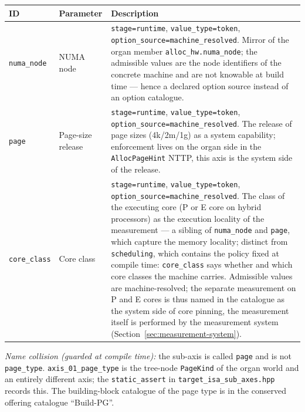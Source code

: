 \begin{scriptsize}
\begin{longtable}{@{}>{\raggedright\arraybackslash}p{1.8cm} >{\raggedright\arraybackslash}p{3.2cm} >{\raggedright\arraybackslash}p{8.5cm}@{}}
\toprule
ID & Parameter & Description \\
\midrule
\endhead%
\texttt{numa\_\allowbreak{}node} & NUMA node & \texttt{stage=runtime}, \texttt{value\_\allowbreak{}type=token}, \texttt{option\_\allowbreak{}source=machine\_\allowbreak{}resolved}. Mirror of the organ member \texttt{alloc\_\allowbreak{}hw.numa\_\allowbreak{}node}; the admissible values are the node identifiers of the concrete machine and are not knowable at build time --- hence a declared option source instead of an option catalogue. \\
\texttt{page} & Page-size release & \texttt{stage=runtime}, \texttt{value\_\allowbreak{}type=token}, \texttt{option\_\allowbreak{}source=machine\_\allowbreak{}resolved}. The release of page sizes (4k/\allowbreak{}2m/\allowbreak{}1g) as a system capability; enforcement lives on the organ side in the \texttt{Alloc\allowbreak{}Page\allowbreak{}Hint} NTTP, this axis is the system side of the release. \\
\texttt{core\_\allowbreak{}class} & Core class & \texttt{stage=runtime}, \texttt{value\_\allowbreak{}type=token}, \texttt{option\_\allowbreak{}source=machine\_\allowbreak{}resolved}. The class of the executing core (P or E core on hybrid processors) as the execution locality of the measurement --- a sibling of \texttt{numa\_\allowbreak{}node} and \texttt{page}, which capture the memory locality; distinct from \texttt{scheduling}, which contains the policy fixed at compile time: \texttt{core\_\allowbreak{}class} says whether and which core classes the machine carries. Admissible values are machine-resolved; the separate measurement on P and E cores is thus named in the catalogue as the system side of core pinning, the measurement itself is performed by the measurement system (Section~\ref{sec:measurement-system}). \\
\bottomrule
\end{longtable}
\end{scriptsize}

\emph{Name collision (guarded at compile time):} the sub-axis is called \texttt{page} and is not \texttt{page\_\allowbreak{}type}. \texttt{axis\_\allowbreak{}01\_\allowbreak{}page\_\allowbreak{}type} is the tree-node \texttt{Page\allowbreak{}Kind} of the organ world and an entirely different axis; the \texttt{static\_\allowbreak{}assert} in \texttt{target\_\allowbreak{}isa\_\allowbreak{}sub\_\allowbreak{}axes.hpp} records this. The building-block catalogue of the page type is in the conserved offering catalogue \enquote{Build-PG}.

